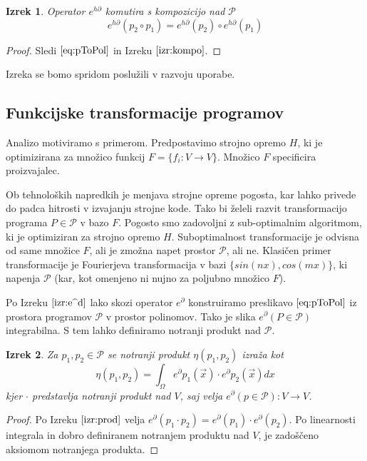 \documentclass{article}
\newcommand{\dP}{\mathcal{P}}
\newcommand{\D}{\partial}
\newtheorem{izrek}{Izrek}[section]
\begin{document}
   \begin{izrek}\label{izr:komp_homo}
   Operator $e^{h\D}$ komutira s kompozicijo nad $\dP$
   \begin{equation}
   e^{h\D}(p_2\circ p_1)=e^{h\D}(p_2)\circ e^{h\D}(p_1)
   \end{equation}
   \end{izrek}
   
   \begin{proof}
   Sledi $\eqref{eq:pToPol}$ in Izreku $\ref{izr:kompo}$.
   \end{proof}
 Izreka se bomo spridom poslužili v razvoju uporabe.
 
   \subsection{Funkcijske transformacije programov}\label{sec:FTP}
  
  Analizo motiviramo s primerom. Predpostavimo strojno opremo $H$, ki je optimizirana za množico funkcij $F=\{f_i:V\to V\}$. Množico $F$ specificira proizvajalec.
  
  Ob tehnoloških napredkih je menjava strojne opreme pogosta, kar lahko privede do padca hitrosti v izvajanju strojne kode. Tako bi želeli razvit transformacijo programa $P\in\dP$ v bazo $F$. Pogosto smo zadovoljni z sub-optimalnim algoritmom, ki je optimiziran za strojno opremo $H$. Suboptimalnost transformacije je odvisna od same množice $F$, ali je zmožna napet prostor $\dP$, ali ne. Klasičen primer transformacije je Fourierjeva transformacija v bazi $\{sin(nx), cos(mx)\}$, ki napenja $\dP$ (kar, kot omenjeno ni nujno za poljubno množico $F$).
  
  Po Izreku $\ref{izr:e^d}$ lako skozi operator $e^\D$ konstruiramo preslikavo $\eqref{eq:pToPol}$ iz prostora programov $\dP$ v prostor polinomov. Tako je slika $e^\D(P\in\dP)$ integrabilna. S tem lahko definiramo notranji produkt nad $\dP$.
  
  \begin{izrek}
  Za $p_1,p_2\in\dP$ se notranji produkt $\eta(p_1,p_2)$ izraža kot
  \begin{equation}
  	\eta(p_1,p_2)=\int_{\Omega}e^\D p_1(\vec{x})\cdot e^\D p_2(\vec{x})dx
  \end{equation}
  kjer $\cdot$ predstavlja notranji produkt nad $V$, saj velja $e^\D(p\in\dP):V\to V$.
  \end{izrek}
  
  \begin{proof}
  Po Izreku $\ref{izr:prod}$ velja $e^\D(p_1\cdot p_2)=e^\D(p_1)\cdot e^\D(p_2)$. Po linearnosti integrala in dobro definiranem notranjem produktu nad $V$, je zadoščeno aksiomom notranjega produkta.
  \end{proof}
  
\end{document}

